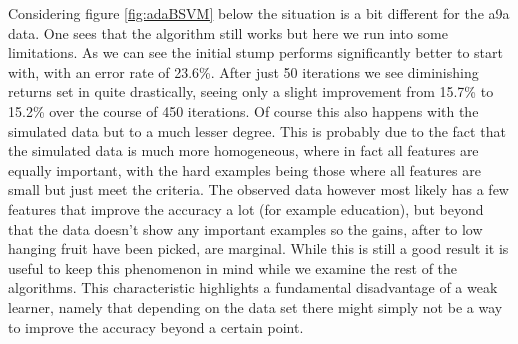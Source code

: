 \newpage
\par Considering figure \ref{fig:adaBSVM} below the situation is a bit different for the a9a data. One sees that the algorithm still works but here we run into some limitations. As we can see the initial stump performs significantly better to start with, with an error rate of 23.6\%. After just 50 iterations we see diminishing returns set in quite drastically, seeing only a slight improvement from 15.7\% to 15.2\% over the course of 450 iterations. Of course this also happens with the simulated data but to a much lesser degree. This is probably due to the fact that the simulated data is much more homogeneous, where in fact all features are equally important, with the hard examples being those where all features are small but just meet the criteria. The observed data however most likely has a few features that improve the accuracy a lot (for example education), but beyond that the data doesn't show any important examples so the gains, after to low hanging fruit have been picked, are marginal. While this is still a good result it is useful to keep this phenomenon in mind while we examine the rest of the algorithms. This characteristic highlights a fundamental disadvantage of a weak learner, namely that depending on the data set there might simply not be a way to improve the accuracy beyond a certain point. 

